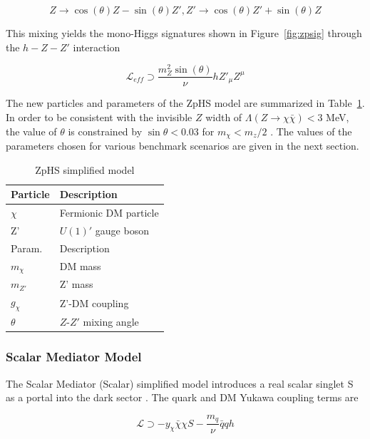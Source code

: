 \begin{equation}
Z \rightarrow \cos(\theta) Z - \sin(\theta) Z', Z' \rightarrow \cos(\theta) Z' + \sin(\theta) Z
\end{equation}

This mixing yields the mono-Higgs signatures shown in Figure~\ref{fig:zpsig} through the $h-Z-Z'$ interaction 

\begin{equation}
\mathcal{L}_{eff} \supset \frac{m_Z^2 \sin(\theta)}{\nu} h Z'_\mu Z^\mu
\end{equation}

The new particles and parameters of the ZpHS model are summarized in Table~\ref{tab:ZpHS}. In order to be consistent with the invisible $Z$ width of $\Lambda(Z\rightarrow \chi\bar{\chi})<3$ MeV, the value of $\theta$ is constrained by $\sin\theta<0.03$ for $m_\chi < m_z/2$ \cite{PhysRevD.86.010001}. The values of the parameters chosen for various benchmark scenarios are given in the next section.

\begin{table}[htbH]
\begin{center}
\begin{tabular}{ l | l}
\hline
Particle & Description \\
\hline
$\chi$ & Fermionic DM particle \\
Z' & $U(1)'$ gauge boson \\
\hline
Param. & Description \\
\hline
$m_\chi$ & DM mass \\
$m_{Z'}$ & Z' mass \\
$g_\chi$ & Z'-DM coupling \\
$\theta$ & $Z$-$Z'$ mixing angle \\
\hline
\end{tabular}
\caption{ZpHS simplified model}\label{tab:ZpHS}
\end{center}
\end{table}

\subsubsection{Scalar Mediator Model}

The Scalar Mediator (Scalar) simplified model introduces a real scalar singlet S as a portal into the dark sector \cite{MarchRussell:2008yu}. The quark and DM Yukawa coupling terms are

\begin{equation}
\mathcal{L} \supset -y_\chi \bar{\chi} \chi S - \frac{m_q}{\nu} \bar{q} q h
\end{equation}

